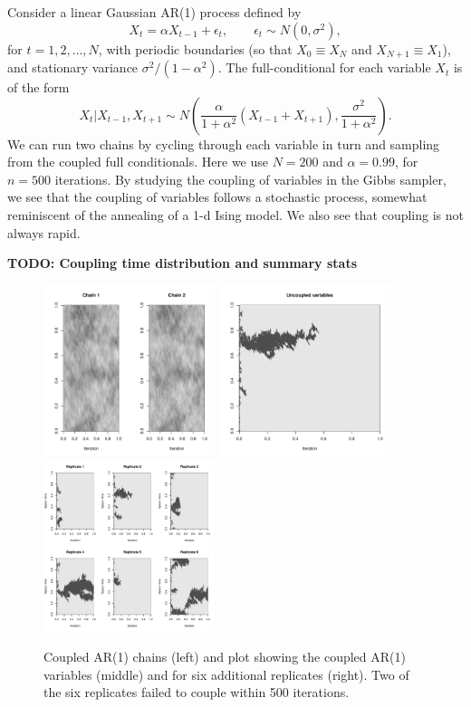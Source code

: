 \documentclass[11pt,a4paper]{article}
\begin{document}
Consider a linear Gaussian AR(1) process defined by
$$
X_t = \alpha X_{t-1} + \epsilon_t,\qquad \epsilon_t \sim N(0,\sigma^2),
$$
for $t=1,2,\ldots,N$, with periodic boundaries (so that $X_0\equiv X_N$ and $X_{N+1}\equiv X_1$), and stationary variance $\sigma^2/(1-\alpha^2)$. The full-conditional for each variable $X_t$ is of the form
$$
X_t|X_{t-1},X_{t+1} \sim N\left(\frac{\alpha}{1+\alpha^2}(X_{t-1}+X_{t+1}), \frac{\sigma^2}{1+\alpha^2} \right).
$$
We can run two chains by cycling through each variable in turn and sampling from the coupled full conditionals. Here we use $N=200$ and $\alpha=0.99$, for $n=500$ iterations. By studying the coupling of variables in the Gibbs sampler, we see that the coupling of variables follows a stochastic process, somewhat reminiscent of the annealing of a 1-d Ising model. We also see that coupling is not always rapid.

\textbf{TODO: Coupling time distribution and summary stats}

\begin{figure}
  \centerline{
    \includegraphics[height=5cm]{figs/coupled-chains}
    \qquad
    \includegraphics[height=5cm]{figs/uncoupled}
    \qquad
  \includegraphics[height=5cm]{figs/uncoupled6}
  }
\caption{Coupled AR(1) chains (left) and plot showing the coupled AR(1) variables (middle) and for six additional replicates (right). Two of the six replicates failed to couple within 500 iterations.}
\end{figure}
\end{document}

